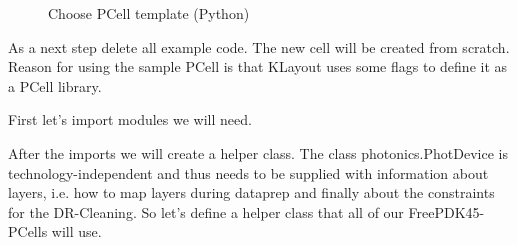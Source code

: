 \documentclass[a4paper,10pt,english]{sphinxmanual}
\begin{document}
\begin{figure}[htbp]
\centering
\capstart

\noindent{}
\caption{Choose PCell template (Python)}\label{\detokenize{example_library:id3}}\end{figure}

As a next step delete all example code. The new cell will be created from scratch. Reason for using the sample PCell is that KLayout
uses some flags to define it as a PCell library.

First let’s import modules we will need.

%
\begin{sphinxVerbatim}[commandchars=\\\{\},numbers=left,firstnumber=1,stepnumber=1]
 
 
    
   
   
 
\end{sphinxVerbatim}

After the imports we will create a helper class. The class photonics.PhotDevice is technology-independent and
thus needs to be supplied with information about layers, i.e. how to map layers during dataprep and finally about
the constraints for the DR-Cleaning. So let’s define a helper class that all of our FreePDK45-PCells will use.
\end{document}
